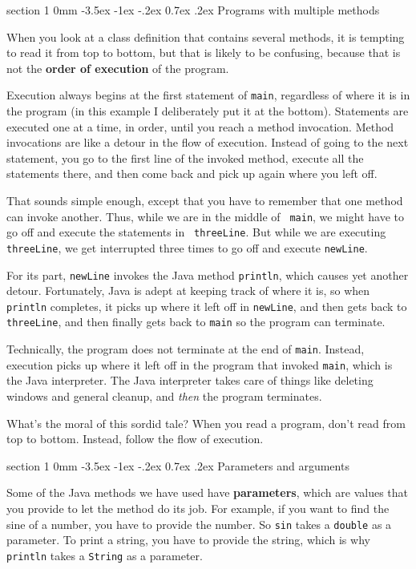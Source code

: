\documentclass{book}
\makeatletter
\renewcommand{\section}{\@startsection 
    {section} {1} {0mm}%
    {-3.5ex \@plus -1ex \@minus -.2ex}%
    {0.7ex \@plus.2ex}%
    {\normalfont\Large\bfseries}}
\makeatother
\begin{document}
\section {Programs with multiple methods}

When you look at a class definition that contains several methods, it
is tempting to read it from top to bottom, but that is likely to be
confusing, because that is not the {\bf order of execution} of the
program.

Execution always begins at the first statement of {\tt main},
regardless of where it is in the program (in this example I deliberately
put it at the bottom).  Statements are executed one at a time, in
order, until you reach a method invocation.  Method invocations are
like a detour in the flow of execution.  Instead of going to the next
statement, you go to the first line of the invoked method, execute all
the statements there, and then come back and pick up again where you
left off.

That sounds simple enough, except that you have to remember that one
method can invoke another.  Thus, while we are in the middle of {\tt
main}, we might have to go off and execute the statements in {\tt
threeLine}.  But while we are executing {\tt threeLine}, we get
interrupted three times to go off and execute {\tt newLine}.

For its part, {\tt newLine} invokes the Java method
{\tt println}, which causes yet another detour.  Fortunately,
Java is adept at keeping track of where it is, so when
{\tt println} completes, it picks up where it left off in
{\tt newLine}, and then gets back to {\tt threeLine}, and then
finally gets back to {\tt main} so the program can terminate.

Technically, the program does not terminate at the
end of {\tt main}.  Instead, execution picks up where it left
off in the program that invoked {\tt main}, which is the
Java interpreter.  The Java interpreter takes care of things
like deleting windows and general cleanup, and {\em then}
the program terminates.

What's the moral of this sordid tale?  When you
read a program, don't read from top to bottom.  Instead,
follow the flow of execution.


\section {Parameters and arguments}

Some of the Java methods we have used have {\bf parameters},
which are values that you provide to let the method do its
job.  For example, if you want to find the sine of a number,
you have to provide the number.  So {\tt sin}
takes a {\tt double} as a parameter.  To print a string,
you have to provide the string, which is why {\tt println}
takes a {\tt String} as a parameter.
\end{document}

